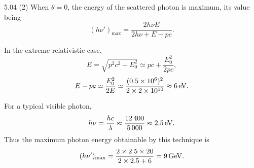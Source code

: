 \begin{solution}{5.04}
(2) When $\theta = 0$, the energy of the scattered photon is maximum, its value being
\begin{equation*}
(h\nu')_{\max} = \frac{2h\nu E}{2h\nu + E - pc}.
\end{equation*}

In the extreme relativistic case,
\begin{equation*}
E = \sqrt{p^2c^2 + E_0^2} \simeq pc + \frac{E_0^2}{2pc},
\end{equation*}
\begin{equation*}
E - pc \simeq \frac{E_0^2}{2E} \simeq \frac{(0.5\times 10^6)^2}{2\times 2\times 10^{10}}
\approx 6\,\mathrm{eV}.
\end{equation*}

For a typical visible photon,
\begin{equation*}
h\nu = \frac{hc}{\lambda} \approx \frac{12\,400}{5\,000} \approx 2.5\,\mathrm{eV}.
\end{equation*}
Thus the maximum photon energy obtainable by this technique is
\begin{equation*}
(h\nu')_{\max} = \frac{2\times 2.5\times 20}{2\times 2.5 + 6} = 9\,\mathrm{GeV}.
\end{equation*}
\end{solution}

